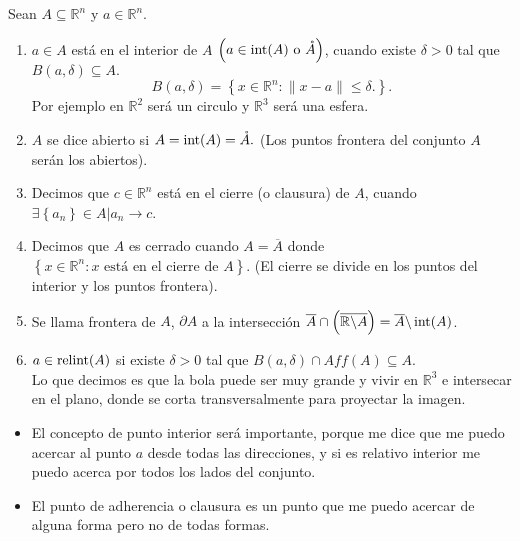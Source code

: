 \begin{def.}\,\\\\
    Sean $A\subseteq \mathbb{R}^n$ y $a\in \mathbb{R}^n$.
    \begin{enumerate}[1)]
	\item $a\in A$ está en el interior de $A$ $\left(a\in \mathop{\mbox{\normalfont int}}\nolimits(A) \mbox{ o } \mathring{A} \right)$, cuando existe $\delta>0$ tal que $B(a,\delta)\subseteq A.$
	$$B(a,\delta)=\left\{x\in \mathbb{R}^n:\|x-a\|\leq \delta.\right\}.$$
	Por ejemplo en $\mathbb{R}^2$ será un circulo y $\mathbb{R}^3$ será una esfera.
	\item $A$ se dice abierto si $A=\mathop{\mbox{\normalfont int}}\nolimits(A)=\mathring{A}.$ (Los puntos frontera del conjunto $A$ serán los abiertos).
	\item Decimos que $c\in\mathbb{R}^n$ está en el cierre (o clausura) de $A$, cuando $\exists \left\{a_n\right\}\in A | a_n\to c$.
	\item Decimos que $A$ es cerrado cuando $A=\overline{A}$ donde $\left\{x\in \mathbb{R}^n: x \mbox{ está en el cierre de }A\right\}.$ (El cierre se divide en los puntos del interior y los puntos frontera).

	\item Se llama frontera de $A$, $\partial{A}$ a la intersección $\overline{A}\cap \left( \overline{\mathbb{R}\backslash A}\right)=\overline{A} \backslash \mathop{\mbox{\normalfont int}}\nolimits(A)$.
	\item $a\in \mathop{\mbox{\normalfont relint}}\nolimits(A)$ si existe $\delta>0$ tal que $B(a,\delta)\cap Aff(A)\subseteq A$.\\
	    Lo que decimos es que la bola puede ser muy grande y vivir en $\mathbb{R}^3$ e intersecar en el plano, donde se corta transversalmente para proyectar la imagen.
    \end{enumerate}
\end{def.}

\begin{itemize}
    \item El concepto de punto interior será importante, porque me dice que me puedo acercar al punto $a$ desde todas las direcciones, y si es relativo interior me puedo acerca por todos los lados del conjunto.
    \item El punto de adherencia o clausura es un punto que me puedo acercar de alguna forma pero no de todas formas.
\end{itemize}


